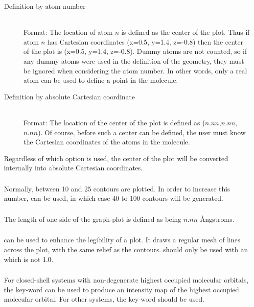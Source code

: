 \begin{description}
\item[Definition by atom number]~\\
Format:   The location of atom $n$ is defined as the center
of  the plot. Thus if atom $n$ has Cartesian coordinates (x=0.5, y=1.4, z=-0.8)
then the center of the plot is (x=0.5, y=1.4, z=-0.8). Dummy atoms are not
counted, so if any dummy atoms were used in the definition of the geometry,
they must be ignored when considering the atom number. In other words, only a
real atom can be used to define a point in the molecule.

\item[Definition by absolute Cartesian coordinate]~\\
Format:  The location of the  center of the
plot is defined as ($n.nn$,$n.nn$,$n.nn$). Of course, before such a center can
be defined, the user must know the Cartesian coordinates of the atoms in the
molecule.
\end{description}

Regardless of which option is used, the center of the plot will be converted
internally into absolute Cartesian coordinates.

\subsubsection*{}
Normally, between 10 and 25 contours are plotted. In order to increase this
number,  can be used, in which case 40 to 100 contours will be
generated.

\subsubsection*{}
The length of one side of the graph-plot is defined as being $n.nn$  \AA ngstroms.

\subsubsection*{}
 can be used to enhance the legibility of a plot. It draws a regular
mesh of lines across the plot, with the same relief as the contours.
 should only be used with an  which is not 1.0.

\subsubsection*{}
For closed-shell systems with non-degenerate highest occupied molecular
orbitals, the key-word  can be used to produce an intensity map of
the highest occupied molecular orbital. For other systems, the key-word
 should be used.

